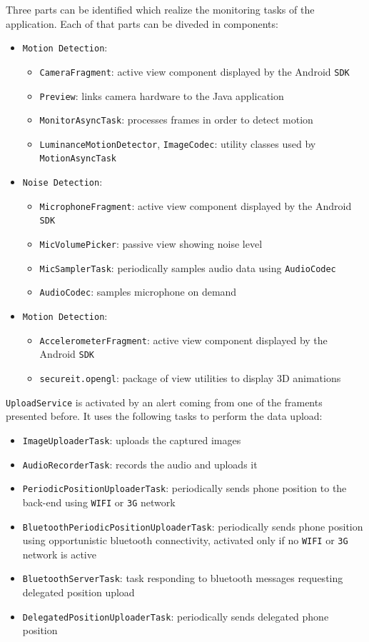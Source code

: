 \documentclass[conference, 11pt]{IEEEtran}
\begin{document}
Three parts can be identified which realize the monitoring tasks of the application. Each of that parts can be diveded in components:
\begin{itemize}
	\item \texttt{Motion Detection}:
		\begin{itemize}
			\item \texttt{CameraFragment}: active view component displayed by the Android \texttt{SDK}
			\item \texttt{Preview}: links camera hardware to the Java application
			\item \texttt{MonitorAsyncTask}: processes frames in order to detect motion
			\item \texttt{LuminanceMotionDetector}, \texttt{ImageCodec}: utility classes used by \texttt{MotionAsyncTask}
		\end{itemize}
	\item \texttt{Noise Detection}:
		\begin{itemize}
			\item \texttt{MicrophoneFragment}: active view component displayed by the Android \texttt{SDK}
			\item \texttt{MicVolumePicker}: passive view showing noise level
			\item \texttt{MicSamplerTask}: periodically samples audio data using \texttt{AudioCodec}
			\item \texttt{AudioCodec}: samples microphone on demand
		\end{itemize}
	\item \texttt{Motion Detection}:
		\begin{itemize}
			\item \texttt{AccelerometerFragment}: active view component displayed by the Android \texttt{SDK}
			\item \texttt{secureit.opengl}: package of view utilities to display 3D animations
		\end{itemize}
\end{itemize}

\texttt{UploadService} is activated by an alert coming from one of the framents presented before. It uses the following tasks to perform the data upload:
\begin{itemize}
	\item \texttt{ImageUploaderTask}: uploads the captured images
	\item \texttt{AudioRecorderTask}: records the audio and uploads it
	\item \texttt{PeriodicPositionUploaderTask}: periodically sends phone position to the back-end using \texttt{WIFI} or \texttt{3G} network
	\item \texttt{Bluetooth\allowbreak Periodic\allowbreak Position\allowbreak Uploader\allowbreak Task}: periodically sends phone position using opportunistic bluetooth connectivity, activated only if no \texttt{WIFI} or \texttt{3G} network is active
	\item \texttt{BluetoothServerTask}: task responding to bluetooth messages requesting delegated position upload
	\item \texttt{DelegatedPositionUploaderTask}: periodically sends delegated phone position
\end{itemize}
\end{document}
